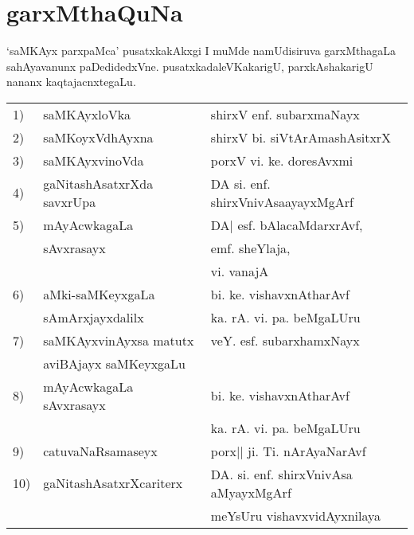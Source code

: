 \chapter*{\quad\qquad\qquad garxMthaQuNa}

`saMKAyx parxpaMca' pusatxkakAkxgi I muMde namUdisiruva garxMthagaLa sahAyavanunx paDedidedxVne. pusatxkadaleVKakarigU, parxkAshakarigU nananx kaqtajacnxtegaLu.

\begin{tabular}{>{\rm }ll@{\hspace{1.5cm}}l}
1) & saMKAyxloVka      & shirxV enf. subarxmaNayx\\[0.2cm]
2) & saMKoyxVdhAyxna    & shirxV bi. siVtArAmashAsitxrX\\[0.2cm]
3) & saMKAyxvinoVda    & porxV vi. ke. doresAvxmi \\[0.2cm]
4) & gaNitashAsatxrXda savxrUpa &  DA si. enf. shirxVnivAsaayayxMgArf\\[0.2cm]
5) & mAyAcwkagaLa  & DA| esf. bAlacaMdarxrAvf,\\   
   &  sAvxrasayx   & \qquad emf. sheYlaja,\\
   &               & \qquad vi. vanajA\\[0.2cm]
6) & aMki-saMKeyxgaLa  & bi. ke. vishavxnAtharAvf \\ 
   & sAmArxjayxdalilx  & ka. rA. vi. pa. beMgaLUru\\[0.2cm]
7) & saMKAyxvinAyxsa matutx & veY. esf. subarxhamxNayx\\
   & aviBAjayx saMKeyxgaLu   &                          \\[0.2cm]
8) & mAyAcwkagaLa sAvxrasayx & bi. ke. vishavxnAtharAvf\\
   &                         & ka. rA. vi. pa. beMgaLUru\\[0.2cm]
9) & catuvaNaRsamaseyx       & porx|| ji. Ti. nArAyaNarAvf\\[0.2cm]
10)&gaNitashAsatxrXcariterx  & DA. si. enf. shirxVnivAsa aMyayxMgArf\\
   &                         & meYsUru vishavxvidAyxnilaya      
\end{tabular}
